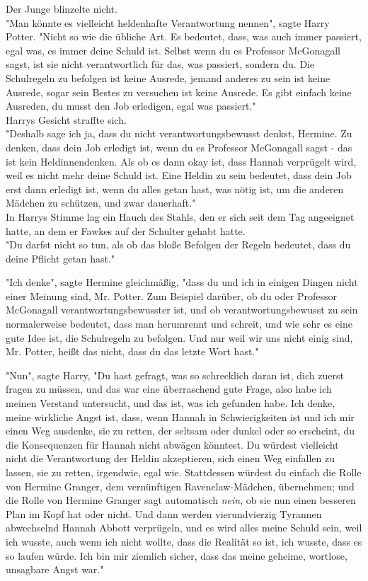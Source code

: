 {Der Junge blinzelte nicht.\\ "Man könnte es vielleicht heldenhafte Verantwortung nennen", sagte Harry Potter. "Nicht so wie die übliche Art. Es bedeutet, dass, was auch immer passiert, egal was, es immer deine Schuld ist. Selbst wenn du es Professor McGonagall sagst, ist sie nicht verantwortlich für das, was passiert, sondern du. Die Schulregeln zu befolgen ist keine Ausrede, jemand anderes zu sein ist keine Ausrede, sogar sein Bestes zu versuchen ist keine Ausrede. Es gibt einfach keine Ausreden, du musst den Job erledigen, egal was passiert."\\ Harrys Gesicht straffte sich.\\ "Deshalb sage ich ja, dass du nicht verantwortungsbewusst denkst, Hermine. Zu denken, dass dein Job erledigt ist, wenn du es Professor McGonagall sagst - das ist kein Heldinnendenken. Als ob es dann okay ist, dass Hannah verprügelt wird, weil es nicht mehr deine Schuld ist. Eine Heldin zu sein bedeutet, dass dein Job erst dann erledigt ist, wenn du alles getan hast, was nötig ist, um die anderen Mädchen zu schützen, und zwar dauerhaft."\\ In Harrys Stimme lag ein Hauch des Stahls, den er sich seit dem Tag angeeignet hatte, an dem er Fawkes auf der Schulter gehabt hatte.\\ "Du darfst nicht so tun, als ob das bloße Befolgen der Regeln bedeutet, dass du deine Pflicht getan hast."

"Ich denke", sagte Hermine gleichmäßig, "dass du und ich in einigen Dingen nicht einer Meinung sind, Mr. Potter. Zum Beispiel darüber, ob du oder Professor McGonagall verantwortungsbewusster ist, und ob verantwortungsbewusst zu sein normalerweise bedeutet, dass man herumrennt und schreit, und wie sehr es eine gute Idee ist, die Schulregeln zu befolgen. Und nur weil wir uns nicht einig sind, Mr. Potter, heißt das nicht, dass du das letzte Wort hast."

"Nun", sagte Harry, "Du hast gefragt, was so schrecklich daran ist, dich zuerst fragen zu müssen, und das war eine überraschend gute Frage, also habe ich meinen Verstand untersucht, und das ist, was ich gefunden habe. Ich denke, meine wirkliche Angst ist, dass, wenn Hannah in Schwierigkeiten ist und ich mir einen Weg ausdenke, sie zu retten, der seltsam oder dunkel oder so erscheint, du die Konsequenzen für Hannah nicht abwägen könntest. Du würdest vielleicht nicht die Verantwortung der Heldin akzeptieren, sich einen Weg einfallen zu lassen, sie zu retten, irgendwie, egal wie. Stattdessen würdest du einfach die Rolle von Hermine Granger, dem vernünftigen Ravenclaw-Mädchen, übernehmen; und die Rolle von Hermine Granger sagt automatisch \emph{nein}, ob sie nun einen besseren Plan im Kopf hat oder nicht. Und dann werden vierundvierzig Tyrannen abwechselnd Hannah Abbott verprügeln, und es wird alles meine Schuld sein, weil ich wusste, auch wenn ich nicht wollte, dass die Realität so ist, ich wusste, dass es so laufen würde. Ich bin mir ziemlich sicher, dass das meine geheime, wortlose, unsagbare Angst war."

}
